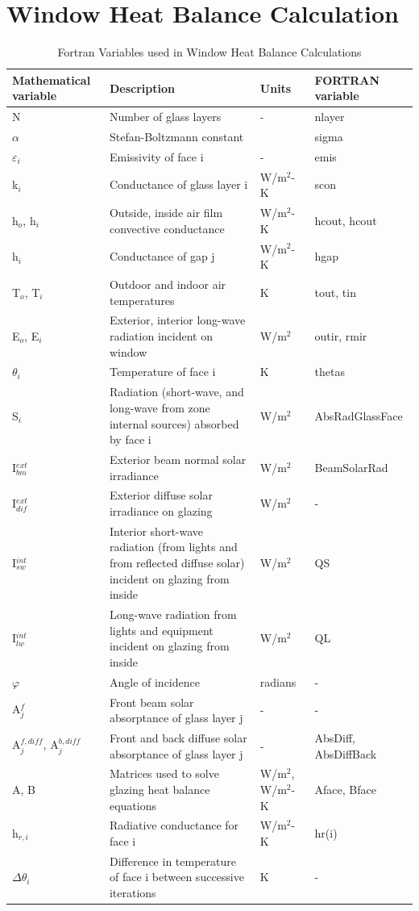 \section{Window Heat Balance Calculation}\label{window-heat-balance-calculation}

\begin{longtable}[c]{p{1.0in}p{2.5in}p{1.0in}p{1.5in}}
\caption{Fortran Variables used in Window Heat Balance Calculations \protect \label{table:fortran-variables-used-in-window-heat-balance}}\\
\toprule 
Mathematical variable & Description & Units & FORTRAN \quad variable \tabularnewline \midrule
\endhead
N & Number of glass layers & - & nlayer \tabularnewline
$\alpha$ & Stefan-Boltzmann constant & ~ & sigma \tabularnewline 
$\varepsilon$\(_{i}\) & Emissivity of face i & - & emis \tabularnewline
k\(_{i}\) & Conductance of glass layer i & W/m\(^{2}\)-K & scon \tabularnewline
h\(_{o}\), h\(_{i}\) & Outside, inside air film convective conductance & W/m\(^{2}\)-K & hcout, hcout \tabularnewline
h\(_{i}\) & Conductance of gap j & W/m\(^{2}\)-K & hgap \tabularnewline
T\(_{o}\), T\(_{i}\) & Outdoor and indoor air temperatures & K & tout, tin \tabularnewline
E\(_{o}\), E\(_{i}\) & Exterior, interior long-wave radiation incident on window & W/m\(^{2}\) & outir, rmir \tabularnewline
$\theta$\(_{i}\) & Temperature of face i & K & thetas \tabularnewline
S\(_{i}\) & Radiation (short-wave, and long-wave from zone internal sources) absorbed by face i & W/m\(^{2}\) & AbsRadGlassFace \tabularnewline
I\(^{ext}_{bm}\) & Exterior beam normal solar irradiance & W/m\(^{2}\) & BeamSolarRad \tabularnewline
I\(^{ext}_{dif}\) & Exterior diffuse solar irradiance on glazing & W/m\(^{2}\) & - \tabularnewline
I\(^{int}_{sw}\) & Interior short-wave radiation (from lights and from reflected diffuse solar) incident on glazing from inside & W/m\(^{2}\) & QS \tabularnewline
I\(^{int}_{lw}\) & Long-wave radiation from lights and equipment incident on glazing from inside & W/m\(^{2}\) & QL \tabularnewline
$\varphi$ & Angle of incidence & radians & - \tabularnewline
A\(^{f}_{j}\) & Front beam solar absorptance of glass layer j & - & - \tabularnewline
A\(^{f,diff}_{j}\), A\(^{b,diff}_{j}\) & Front and back diffuse solar absorptance of glass layer j & - & AbsDiff, AbsDiffBack \tabularnewline
A, B & Matrices used to solve glazing heat balance equations & W/m\(^{2}\), W/m\(^{2}\)-K & Aface, Bface \tabularnewline
h\(_{r,i}\) & Radiative conductance for face i & W/m\(^{2}\)-K & hr(i) \tabularnewline
$\Delta\theta$\(_{i}\) & Difference in temperature of face i between successive iterations & K & - \tabularnewline
\bottomrule
\end{longtable}

